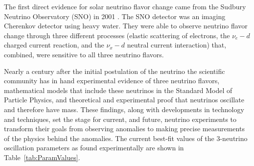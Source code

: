 The first direct evidence for solar neutrino flavor change came from the Sudbury Neutrino Observatory (SNO) in 2001 \cite{SNO,SNOOsc}. 
The SNO detector was an imaging Cherenkov detector using heavy water.
They were able to observe neutrino flavor change through three different processes (elastic scattering of electrons, the $\nu_e - d$ charged current reaction, and the $\nu_x - d$ neutral current interaction) that, combined, were sensitive to all three neutrino flavors.

Nearly a century after the initial postulation of the neutrino the scientific community has in hand experimental evidence of three neutrino flavors, mathematical models that include these neutrinos in the Standard Model of Particle Physics, and theoretical and experimental proof that neutrinos oscillate and therefore have mass.
These findings, along with developments in technology and techniques, set the stage for current, and future, neutrino experiments to transform their goals from observing anomalies to making precise measurements of the physics behind the anomalies.
The current best-fit values of the 3-neutrino oscillation parameters as found experimentally are shown in Table~\ref{tab:ParamValues}.


